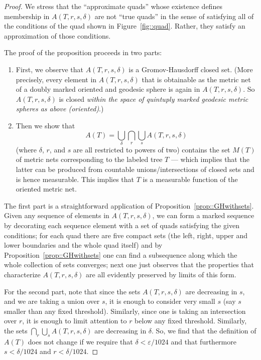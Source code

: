 \documentclass[10pt]{amsart}
\let\epsilon\varepsilon
\theoremstyle{plain}
\numberwithin{theorem}{section}
\theoremstyle{definition}
\begin{document}
\begin{proof}
We stress that the ``approximate quads'' whose existence defines membership in $A(T,r,s,\delta)$ are not ``true quads'' in the sense of satisfying all of the conditions of the quad shown in Figure~\ref{fig::quad}. Rather, they satisfy an approximation of those conditions.

The proof of the proposition proceeds in two parts:
\begin{enumerate}
\item First, we observe that $A(T,r,s,\delta)$ is a Gromov-Hausdorff closed set. (More precisely, every element in $A(T,r,s,\delta)$ that is obtainable as the metric net of a doubly marked oriented and geodesic sphere is again in $A(T,r,s,\delta)$. So $A(T,r,s,\delta)$ is closed \emph{within the space of quintuply marked geodesic metric spheres as above (\ie oriented)}.)
\item
Then we show that\vspace*{-6pt}\enlargethispage{.7\baselineskip}%
\[
A(T) = \bigcup_\delta \bigcap_r \bigcup_s A(T,r,s,\delta)
\]
(where $\delta$, $r$, and $s$ are all restricted to powers of two) contains the set $M(T)$ of metric nets corresponding to the labeled tree $T$ --- which implies that the latter can be produced from countable unions/intersections of closed sets and is hence measurable. This implies that $T$ is a measurable function of the oriented metric net.
\end{enumerate}

The first part is a straightforward application of Proposition~\ref{prop::GHwithsets}. Given any sequence of elements in $A(T,r,s,\delta)$, we can form a marked sequence by decorating each sequence element with a set of quads satisfying the given conditions; for each quad there are five compact sets (the left, right, upper and lower boundaries and the whole quad itself) and by Proposition~\ref{prop::GHwithsets} one can find a subsequence along which the whole collection of sets converges; next one just observes that the properties that characterize $A(T,r,s,\delta)$ are all evidently preserved by limits of this form.

For the second part, note that since the sets $A(T,r,s,\delta)$ are decreasing in $s$, and we are taking a union over $s$, it is enough to consider very small $s$ (say $s$ smaller than any fixed threshold). Similarly, since one is taking an intersection over $r$, it is enough to limit attention to $r$ below any fixed threshold. Similarly, the sets $ \bigcap_r \bigcup_s A(T,r,s,\delta)$ are decreasing in $\delta$. So, we find that the definition of $A(T)$ does not change if we require that $\delta < \epsilon/1024$ and that furthermore $s < \delta /1024$ and $r < \delta / 1024$.


\end{proof}
\end{document}
